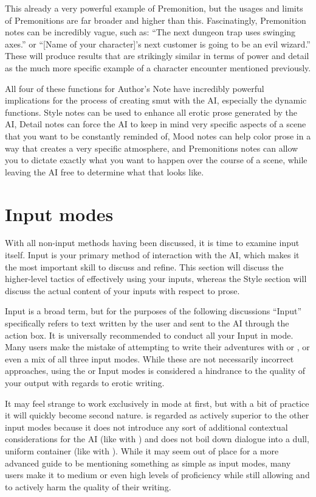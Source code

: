\documentclass[Source-main.tex]{subfiles}
\begin{document}
This already a very powerful example of Premonition, but the usages and limits of Premonitions are far broader and higher than this.
Fascinatingly, Premonition notes can be incredibly vague, such as: “The next dungeon trap uses swinging axes.” or “[Name of your character]’s next customer is going to be an evil wizard.” These will produce results that are strikingly similar in terms of power and detail as the much more specific example of a character encounter mentioned previously.

All four of these functions for Author’s Note have incredibly powerful implications for the process of creating smut with the AI, especially the dynamic functions.
Style notes can be used to enhance all erotic prose generated by the AI, Detail notes can force the AI to keep in mind very specific aspects of a scene that you want to be constantly reminded of, Mood notes can help color prose in a way that creates a very specific atmosphere, and Premonitions notes can allow you to dictate exactly what you want to happen over the course of a scene, while leaving the AI free to determine what that looks like.


\section{Input modes}

With all non-input methods having been discussed, it is time to examine input itself.
Input is your primary method of interaction with the AI, which makes it the most important skill to discuss and refine.
This section will discuss the higher-level tactics of effectively using your inputs, whereas the Style section will discuss the actual content of your inputs with respect to prose.

Input is a broad term, but for the purposes of the following discussions “Input” specifically refers to text written by the user and sent to the AI through the action box.
It is universally recommended to conduct all your Input in  mode.
Many users make the mistake of attempting to write their adventures with  or , or even a mix of all three input modes.
While these are not necessarily incorrect approaches, using the  or  Input modes is considered a hindrance to the quality of your output with regards to erotic writing.

It may feel strange to work exclusively in  mode at first, but with a bit of practice it will quickly become second nature.
 is regarded as actively superior to the other input modes because it does not introduce any sort of additional contextual considerations for the AI (like with ) and does not boil down dialogue into a dull, uniform container (like with ).
While it may seem out of place for a more advanced guide to be mentioning something as simple as input modes, many users make it to medium or even high levels of proficiency while still allowing  and  to actively harm the quality of their writing.
\end{document}
